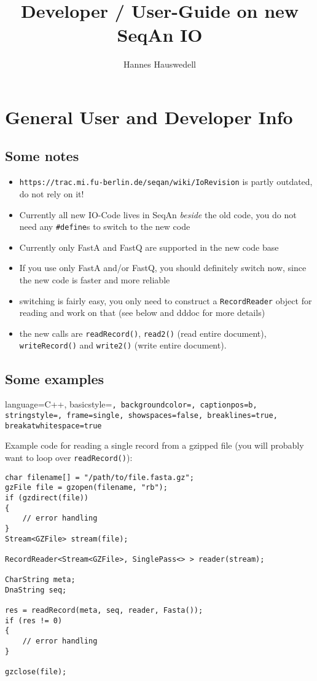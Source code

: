 \documentclass[a4paper,12pt]{scrartcl}
\title{Developer / User-Guide on new SeqAn IO}
\author{Hannes Hauswedell}
\begin{document}
\section{General User and Developer Info}

\subsection{Some notes}

\begin{itemize}
\item \verb#https://trac.mi.fu-berlin.de/seqan/wiki/IoRevision# is partly 
outdated, do not rely on it!
\item Currently all new IO-Code lives in SeqAn \emph{beside} the old code, you 
do not need any \verb|#define|s to switch to the new code
\item Currently only FastA and FastQ are supported in the new code base
\item If you use only FastA and/or FastQ, you should definitely switch now, 
since the new code is faster and more reliable
\item switching is fairly easy, you only need to construct a \verb#RecordReader#
object for reading and work on that (see below and dddoc for more details)
\item the new calls are \verb#readRecord()#, \verb#read2()# (read entire document),
\verb#writeRecord()# and \verb#write2()# (write entire document).
\end{itemize}


\subsection{Some examples}
 \lstset
{
    language=C++,
    basicstyle=\color{black}\footnotesize\tt,
    backgroundcolor=\color{white},
    captionpos=b,
     stringstyle=\ttfamily,
    frame=single,
    showspaces=false,
    breaklines=true,        %
    breakatwhitespace=true
}

Example code for reading a single record from a gzipped file (you will probably
want to loop over \verb#readRecord()#):
\begin{lstlisting}
char filename[] = "/path/to/file.fasta.gz";
gzFile file = gzopen(filename, "rb");
if (gzdirect(file)) 
{
	// error handling
}
Stream<GZFile> stream(file);

RecordReader<Stream<GZFile>, SinglePass<> > reader(stream);

CharString meta;
DnaString seq;

res = readRecord(meta, seq, reader, Fasta());
if (res != 0)
{
	// error handling
}

gzclose(file);
\end{lstlisting}
\end{document}
